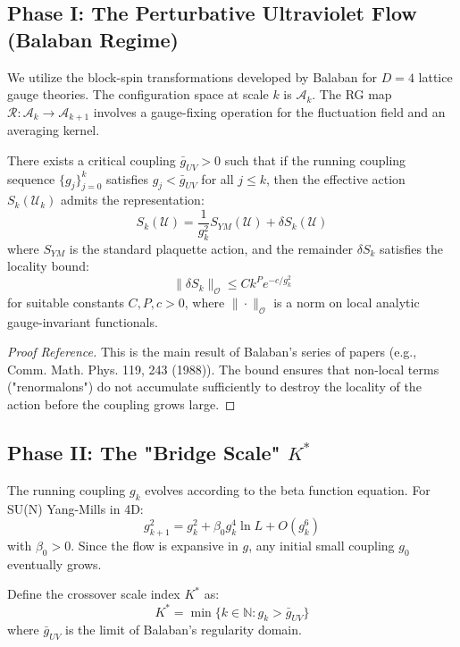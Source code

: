 \subsection{Phase I: The Perturbative Ultraviolet Flow (Balaban Regime)}

We utilize the block-spin transformations developed by Balaban for $D=4$ lattice gauge theories. The configuration space at scale $k$ is $\mathcal{A}_k$. The RG map $\mathcal{R}: \mathcal{A}_k \to \mathcal{A}_{k+1}$ involves a gauge-fixing operation for the fluctuation field and an averaging kernel.

\begin{lemma}
\label{lemma:balaban_control}
There exists a critical coupling $\bar{g}_{UV} > 0$ such that if the running coupling sequence $\{g_j\}_{j=0}^k$ satisfies $g_j < \bar{g}_{UV}$ for all $j \le k$, then the effective action $S_k(\mathcal{U}_k)$ admits the representation:
\[
S_k(\mathcal{U}) = \frac{1}{g_k^2} S_{YM}(\mathcal{U}) + \delta S_k(\mathcal{U})
\]
where $S_{YM}$ is the standard plaquette action, and the remainder $\delta S_k$ satisfies the locality bound:
\[
\| \delta S_k \|_{\mathcal{O}} \le C k^P e^{-c/g_k^2}
\]
for suitable constants $C, P, c > 0$, where $\|\cdot\|_{\mathcal{O}}$ is a norm on local analytic gauge-invariant functionals.
\end{lemma}

\begin{proof}[Proof Reference]
This is the main result of Balaban's series of papers (e.g., Comm. Math. Phys. 119, 243 (1988)). The bound ensures that non-local terms ("renormalons") do not accumulate sufficiently to destroy the locality of the action before the coupling grows large.
\end{proof}

\subsection{Phase II: The "Bridge Scale" $K^*$}

The running coupling $g_k$ evolves according to the beta function equation. For SU(N) Yang-Mills in 4D:
\[
g_{k+1}^2 = g_k^2 + \beta_0 g_k^4 \ln L + O(g_k^6)
\]
with $\beta_0 > 0$. Since the flow is expansive in $g$, any initial small coupling $g_0$ eventually grows.

\begin{definition}
Define the crossover scale index $K^*$ as:
\[
K^* = \min \{ k \in \mathbb{N} : g_k > \bar{g}_{UV} \}
\]
where $\bar{g}_{UV}$ is the limit of Balaban's regularity domain.
\end{definition}

